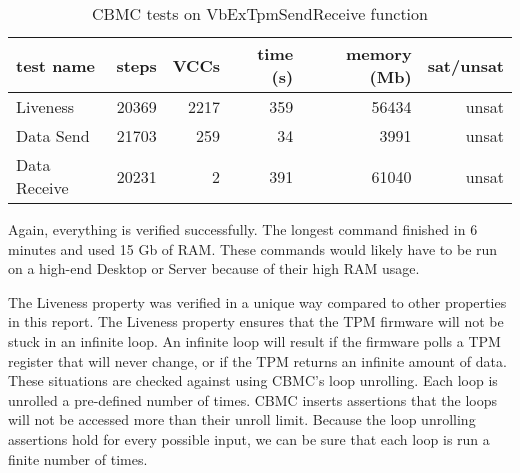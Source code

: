 \begin{table}[!htbp]
    \centering
    \caption{CBMC tests on VbExTpmSendReceive function}\label{tpmSR_results}
    \begin{tabular}{lrrrrr}
        \toprule
        test name & steps & VCCs & time (s) & memory (Mb) & sat/unsat  \\ \midrule
        Liveness & 20369 & 2217 & 359 & 56434 & unsat \\
        Data Send & 21703 & 259 & 34 & 3991 & unsat \\
        Data Receive & 20231 & 2 & 391 & 61040 & unsat \\ \bottomrule

    \end{tabular}
\end{table}

Again, everything is verified successfully. 
The longest command finished in 6 minutes and used 15 Gb of RAM. 
These commands would likely have to be run on a high-end Desktop or Server because of their high RAM usage.

The Liveness property was verified in a unique way compared to other properties in this report.
The Liveness property ensures that the TPM firmware will not be stuck in an infinite loop.
An infinite loop will result if the firmware polls a TPM register that will never change, or if the TPM returns an infinite amount of data.
These situations are checked against using CBMC's loop unrolling.
Each  loop is unrolled a pre-defined number of times.
CBMC inserts assertions that the loops will not be accessed more than their unroll limit.
Because the loop unrolling assertions hold for every possible input, we can be sure that each loop is run a finite number of times.
